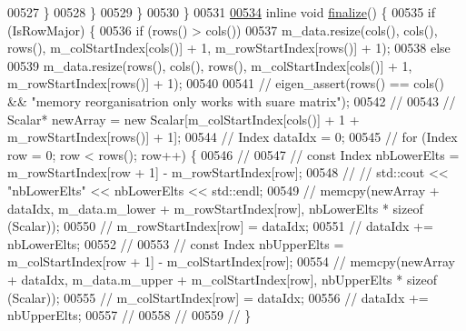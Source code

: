 \begin{DoxyCode}
00527                 \}
00528             \}
00529         \}
00530     \}
00531 
\hyperlink{class_eigen_1_1_skyline_matrix_a1269310d041fb3ca2a980644f3cfe5a2}{00534}     \textcolor{keyword}{inline} \textcolor{keywordtype}{void} \hyperlink{class_eigen_1_1_skyline_matrix_a1269310d041fb3ca2a980644f3cfe5a2}{finalize}() \{
00535         \textcolor{keywordflow}{if} (IsRowMajor) \{
00536             \textcolor{keywordflow}{if} (rows() > cols())
00537                 m\_data.resize(cols(), cols(), rows(), m\_colStartIndex[cols()] + 1, m\_rowStartIndex[rows()] 
      + 1);
00538             \textcolor{keywordflow}{else}
00539                 m\_data.resize(rows(), cols(), rows(), m\_colStartIndex[cols()] + 1, m\_rowStartIndex[rows()] 
      + 1);
00540 
00541             \textcolor{comment}{//            eigen\_assert(rows() == cols() && "memory reorganisatrion only works with suare
       matrix");}
00542             \textcolor{comment}{//}
00543             \textcolor{comment}{//            Scalar* newArray = new Scalar[m\_colStartIndex[cols()] + 1 +
       m\_rowStartIndex[rows()] + 1];}
00544             \textcolor{comment}{//            Index dataIdx = 0;}
00545             \textcolor{comment}{//            for (Index row = 0; row < rows(); row++) \{}
00546             \textcolor{comment}{//}
00547             \textcolor{comment}{//                const Index nbLowerElts = m\_rowStartIndex[row + 1] - m\_rowStartIndex[row];}
00548             \textcolor{comment}{//                //                std::cout << "nbLowerElts" << nbLowerElts << std::endl;}
00549             \textcolor{comment}{//                memcpy(newArray + dataIdx, m\_data.m\_lower + m\_rowStartIndex[row], nbLowerElts
       * sizeof (Scalar));}
00550             \textcolor{comment}{//                m\_rowStartIndex[row] = dataIdx;}
00551             \textcolor{comment}{//                dataIdx += nbLowerElts;}
00552             \textcolor{comment}{//}
00553             \textcolor{comment}{//                const Index nbUpperElts = m\_colStartIndex[row + 1] - m\_colStartIndex[row];}
00554             \textcolor{comment}{//                memcpy(newArray + dataIdx, m\_data.m\_upper + m\_colStartIndex[row], nbUpperElts
       * sizeof (Scalar));}
00555             \textcolor{comment}{//                m\_colStartIndex[row] = dataIdx;}
00556             \textcolor{comment}{//                dataIdx += nbUpperElts;}
00557             \textcolor{comment}{//}
00558             \textcolor{comment}{//}
00559             \textcolor{comment}{//            \}}

\end{DoxyCode}
